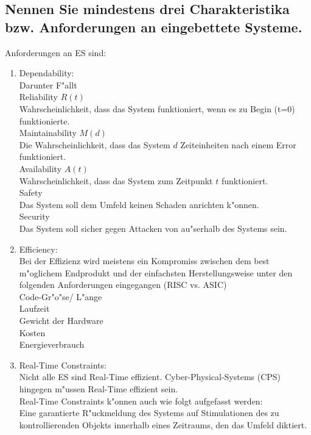 \documentclass{article}
\begin{document}
\subsection{Nennen Sie mindestens drei Charakteristika bzw. Anforderungen an 
            eingebettete Systeme.}

Anforderungen an ES sind:\\
\begin{enumerate}
    \item Dependability:\\
          Darunter F"allt\\
          \subitem Reliability $R(t)$\\
                   Wahrscheinlichkeit, dass das System funktioniert, wenn es zu 
                   Begin (t=0) funktionierte.\\
          \subitem Maintainability $M(d)$\\
                   Die Wahrscheinlichkeit, dass das System $d$ Zeiteinheiten nach 
                   einem Error funktioniert.\\
          \subitem Availability $A(t)$\\
                   Wahrscheinlichkeit, dass das System zum Zeitpunkt $t$ 
                   funktioniert.\\
          \subitem Safety\\
                   Das System soll dem Umfeld keinen Schaden anrichten k"onnen.\\
          \subitem Security\\
                   Das System soll sicher gegen Attacken von au"serhalb des 
                   Systems sein.\\
    \item Efficiency:\\
          Bei der Effizienz wird meistens ein Kompromiss zwischen dem best 
          m"oglichem Endprodukt und der einfachsten Herstellungsweise unter den
          folgenden Anforderungen eingegangen (RISC vs. ASIC)\\
          \subitem Code-Gr"o"se/ L"ange\\
          \subitem Laufzeit\\
          \subitem Gewicht der Hardware\\
          \subitem Kosten\\
          \subitem Energieverbrauch\\
    \item Real-Time Constraints:\\
          Nicht alle ES sind Real-Time effizient. Cyber-Physical-Systems (CPS)
          hingegen m"ussen Real-Time effizient sein.\\
          Real-Time Constraints k"onnen auch wie folgt aufgefasst werden:\\
          Eine garantierte R"uckmeldung des Systems auf Stimulationen des zu
          kontrollierenden Objekts innerhalb eines Zeitraums, den das Umfeld
          diktiert.\\
\end{enumerate}
\end{document}
